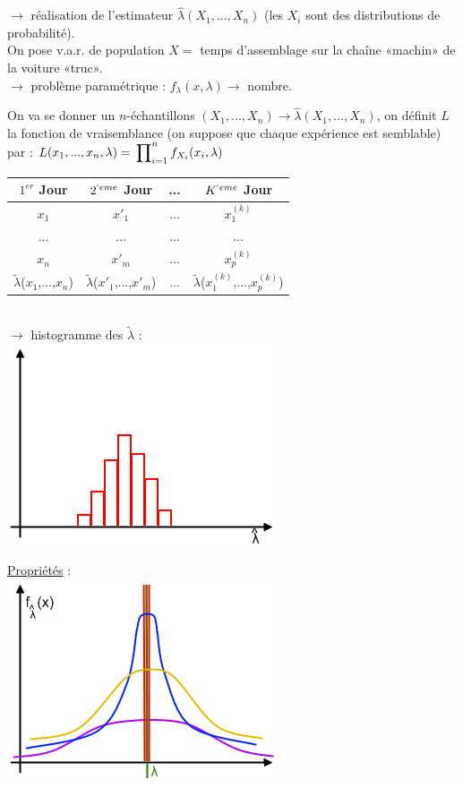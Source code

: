 \documentclass{article}
\newcommand{\lti}{\tilde{\lambda}}
\newcommand{\lcha}{\hat{\lambda}}
\begin{document}
$\rightarrow$ réalisation de l'estimateur $\lcha(X_1,...,X_n)$ (les $X_i$ sont des distributions de probabilité).\\

\noindent On pose v.a.r. de population $X = $ temps d'assemblage sur la chaîne «machin» de la voiture «truc».\\
$\rightarrow$ problème paramétrique : $f_\lambda(x,\lambda) \rightarrow$ nombre.

\noindent On va se donner un $n$-échantillons $(X_1,...,X_n)\rightarrow \lcha(X_1,...,X_n)$, on définit $L$ la
fonction de vraisemblance (on suppose que chaque expérience est semblable) par : 
$L(x_1,...,x_n,\lambda) = \sideset{}{^n_{i=1}}\prod{f_{X_i}(x_i,\lambda)}$ \\

\begin{tabular}{|*{4}{c|}}
\hline
\textbf{$1^{er}$ Jour} & \textbf{$2^{`eme}$ Jour} & ... & \textbf{$K^{`eme}$ Jour} \\
\hline
$x_1$ & $x'_1$ & ... & $x_1^{(k)}$ \\
\hline
... & ... & ... & ...\\
\hline
$x_n$ & $x'_m$ & ... & $x_p^{(k)}$ \\
\hline
$\lti$($x_1$,...,$x_n$) & $\lti$($x'_1$,...,$x'_m$) & ... & $\lti$($x_1^{(k)}$,...,$x_p^{(k)}$) \\
\hline
\end{tabular} \\

$\rightarrow$ histogramme des $\lti$ : \\

\includegraphics{Figure2-3.png}

\underline{Propriétés} : \\

\includegraphics{Figure2-4.png}
\end{document}
